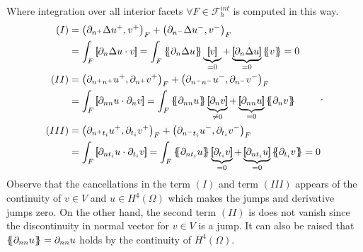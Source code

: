 Where integration over all interior facets $ \forall F \in \mathcal{F}_{h}^{int}$ is computed in this way.
\begin{equation*}
    \begin{split}
        (I) &  =    \left(\partial _{n^{+}} \Delta  u^{+} ,v^{+}\right)_{F} +
        \left(\partial _{n^{-}} \Delta  u^{-} ,v^{-}\right)_{F}  \\
            & =   \int_{F}^{}
            \jump{ \partial _{n} \Delta  u \cdot v } =
            \int_{F}^{}
            \mean{ \partial _{n} \Delta  u } \underbrace{\jump{ v }}_{= 0}    + \underbrace{\jump{ \partial _{n} \Delta  u
            }}_{= 0}    \mean{ v } = 0 \\
            (II) &  =     \left(\partial _{n^{+}n^{+}} u^{+}, \partial_{n^{+}} v^{+} \right)_{F} +  \left(\partial _{n^{-}n^{-}} u^{-}, \partial_{n^{-}} v^{-} \right)_{F}    \\
                 &= \int_{F}^{} \jump{ \partial _{nn} u \cdot  \partial_{n} v }   = \int_{F}^{}
                       \mean{ \partial _{nn} u    } \underbrace{\jump{ \partial_{n} v }  }_{\neq 0}    + \underbrace{\jump{ \partial
                               _{nn}  u
                       }}_{= 0}    \mean{ \partial _{n}v } \\
            (III) &  =     \left(\partial _{n^{+}t_{i}} u^{+}, \partial_{t_{i}} v^{+}
                \right)_{F} +  \left(\partial _{n^{-}t_{i}} u^{-}, \partial_{t_{i}} v^{-}
                \right)_{F}   \\
                 &  =   \int_{F}^{}
                 \jump{ \partial _{nt_{i}} u \cdot  \partial_{t_{i}} v } =
                 \int_{F}^{}
                 \mean{ \partial _{nt_{i}} u    } \underbrace{\jump{ \partial_{t_{i}} v }  }_{= 0}    + \underbrace{\jump{ \partial
                         _{nt_{i}}  u
                 }}_{= 0}    \mean{ \partial _{t_{i}}v }  = 0
                   \end{split}
.\end{equation*}
Observe that the cancellations in the term $(I)$ and term $(III)$  appears of the continuity of $v\in V $ and $u\in H^{4}( \Omega ) $ which makes the jumps and derivative jumps zero. On the other hand, the second term $(II)$  is does not vanish since the discontinuity in normal vector for $v \in V$ is a jump. It can also be raised that $\left\{\!\!\left\{
\partial _{nn} u \right\}\!\!\right\} = \partial _{nn} u  $ holds by the continuity of $H^{4}( \Omega  ) $.

